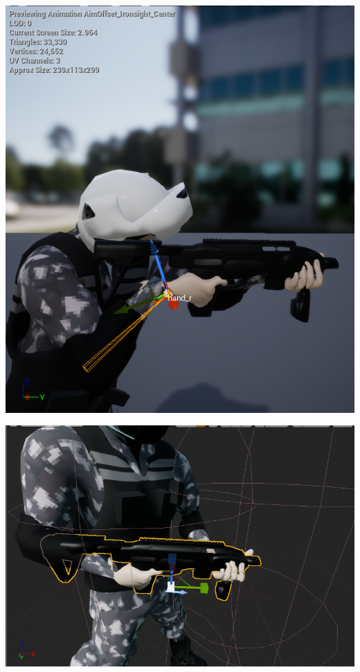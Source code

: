 \documentclass{article}
\begin{document}
  \includegraphics[width=\textwidth]{89.png}

  \includegraphics[width=\textwidth]{90.png}
\end{document}

